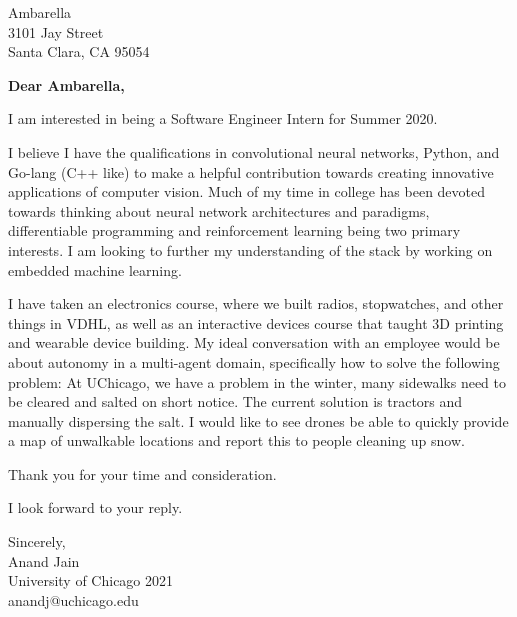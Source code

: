 \documentclass[11pt,a4paper]{letter} %
\begin{document}
\begin{letter}{Ambarella \\ 3101 Jay Street \\ Santa Clara, CA 95054} 

\opening{\textbf{Dear Ambarella,}}

I am interested in being a Software Engineer Intern for Summer 2020.

I believe I have the qualifications in convolutional neural networks, Python, and Go-lang (C++ like) to make a helpful contribution towards creating innovative applications of computer vision. Much of my time in college has been devoted towards thinking about neural network architectures and paradigms, differentiable programming and reinforcement learning being two primary interests. I am looking to further my understanding of the stack by working on embedded machine learning.

I have taken an electronics course, where we built radios, stopwatches, and other things in VDHL, as well as an interactive devices course that taught 3D printing and wearable device building.
My ideal conversation with an employee would be about autonomy in a multi-agent domain, specifically how to solve the following problem: At UChicago, we have a problem in the winter, many sidewalks need to be cleared and salted on short notice. The current solution is tractors and manually dispersing the salt. I would like to see drones be able to quickly provide a map of unwalkable locations and report this to people cleaning up snow.

Thank you for your time and consideration.

I look forward to your reply.

\closing{Sincerely, \\ Anand Jain \\ University of Chicago 2021 \\ anandj@uchicago.edu}

\end{letter}
 
\end{document}
